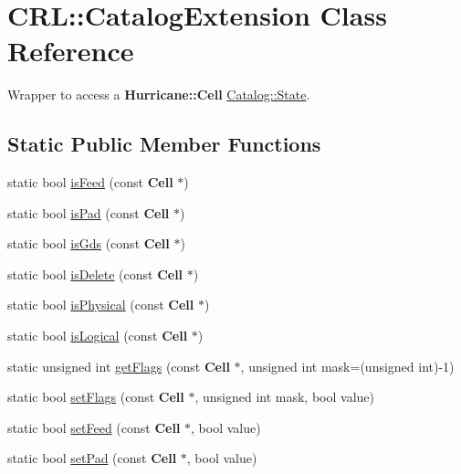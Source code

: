 \hypertarget{classCRL_1_1CatalogExtension}{\section{C\-R\-L\-:\-:Catalog\-Extension Class Reference}
\label{classCRL_1_1CatalogExtension}
}


Wrapper to access a {\bf Hurricane\-::\-Cell} \hyperlink{classCRL_1_1Catalog_1_1State}{Catalog\-::\-State}.  


\subsection*{Static Public Member Functions}
\begin{DoxyCompactItemize}
\item 
static bool \hyperlink{classCRL_1_1CatalogExtension_a5feda5d6fba490a71e3742361ec7b4a1}{is\-Feed} (const {\bf Cell} $\ast$)
\item 
static bool \hyperlink{classCRL_1_1CatalogExtension_a2695acabeac2f224fa4ac3a9563aeee9}{is\-Pad} (const {\bf Cell} $\ast$)
\item 
static bool \hyperlink{classCRL_1_1CatalogExtension_a37c8d304e7386ee31b73c826cb929e5f}{is\-Gds} (const {\bf Cell} $\ast$)
\item 
static bool \hyperlink{classCRL_1_1CatalogExtension_a90e941d2349f5a0f4f7fefb41b434b0a}{is\-Delete} (const {\bf Cell} $\ast$)
\item 
static bool \hyperlink{classCRL_1_1CatalogExtension_a3af53ef4a7fa512a079adbcb68677e2f}{is\-Physical} (const {\bf Cell} $\ast$)
\item 
static bool \hyperlink{classCRL_1_1CatalogExtension_a558c506a28d2230e592080dccbcca380}{is\-Logical} (const {\bf Cell} $\ast$)
\item 
static unsigned int \hyperlink{classCRL_1_1CatalogExtension_a56af8791146665dab3f0f0f33317ac82}{get\-Flags} (const {\bf Cell} $\ast$, unsigned int mask=(unsigned int)-\/1)
\item 
static bool \hyperlink{classCRL_1_1CatalogExtension_ab9475735032d500f4d4a8cf980864b3e}{set\-Flags} (const {\bf Cell} $\ast$, unsigned int mask, bool value)
\item 
static bool \hyperlink{classCRL_1_1CatalogExtension_ab82e4b139ca636feaca5d97836891b68}{set\-Feed} (const {\bf Cell} $\ast$, bool value)
\item 
static bool \hyperlink{classCRL_1_1CatalogExtension_afceda0d184ed2964e160b563a216bc35}{set\-Pad} (const {\bf Cell} $\ast$, bool value)

\end{DoxyCompactItemize}
